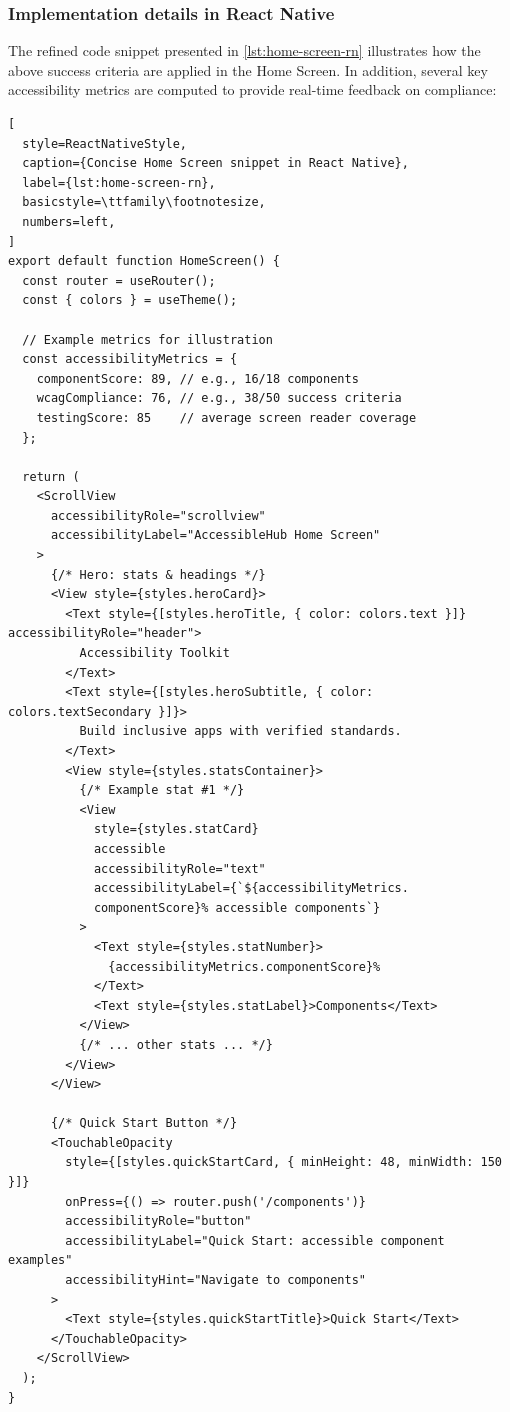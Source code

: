 \subsubsection{Implementation details in React Native}

The refined code snippet presented in \ref{lst:home-screen-rn} illustrates how the above success criteria are applied in the Home Screen. In addition, several key accessibility metrics are computed to provide real-time feedback on compliance:

\begin{lstlisting}[
  style=ReactNativeStyle,
  caption={Concise Home Screen snippet in React Native}, 
  label={lst:home-screen-rn}, 
  basicstyle=\ttfamily\footnotesize,
  numbers=left,
]
export default function HomeScreen() {
  const router = useRouter();
  const { colors } = useTheme();

  // Example metrics for illustration
  const accessibilityMetrics = {
    componentScore: 89, // e.g., 16/18 components
    wcagCompliance: 76, // e.g., 38/50 success criteria
    testingScore: 85    // average screen reader coverage
  };

  return (
    <ScrollView
      accessibilityRole="scrollview"
      accessibilityLabel="AccessibleHub Home Screen"
    >
      {/* Hero: stats & headings */}
      <View style={styles.heroCard}>
        <Text style={[styles.heroTitle, { color: colors.text }]} accessibilityRole="header">
          Accessibility Toolkit
        </Text>
        <Text style={[styles.heroSubtitle, { color: colors.textSecondary }]}>
          Build inclusive apps with verified standards.
        </Text>
        <View style={styles.statsContainer}>
          {/* Example stat #1 */}
          <View
            style={styles.statCard}
            accessible
            accessibilityRole="text"
            accessibilityLabel={`${accessibilityMetrics.
            componentScore}% accessible components`}
          >
            <Text style={styles.statNumber}>
              {accessibilityMetrics.componentScore}%
            </Text>
            <Text style={styles.statLabel}>Components</Text>
          </View>
          {/* ... other stats ... */}
        </View>
      </View>

      {/* Quick Start Button */}
      <TouchableOpacity
        style={[styles.quickStartCard, { minHeight: 48, minWidth: 150 }]}
        onPress={() => router.push('/components')}
        accessibilityRole="button"
        accessibilityLabel="Quick Start: accessible component examples"
        accessibilityHint="Navigate to components"
      >
        <Text style={styles.quickStartTitle}>Quick Start</Text>
      </TouchableOpacity>
    </ScrollView>
  );
}

\end{lstlisting}

